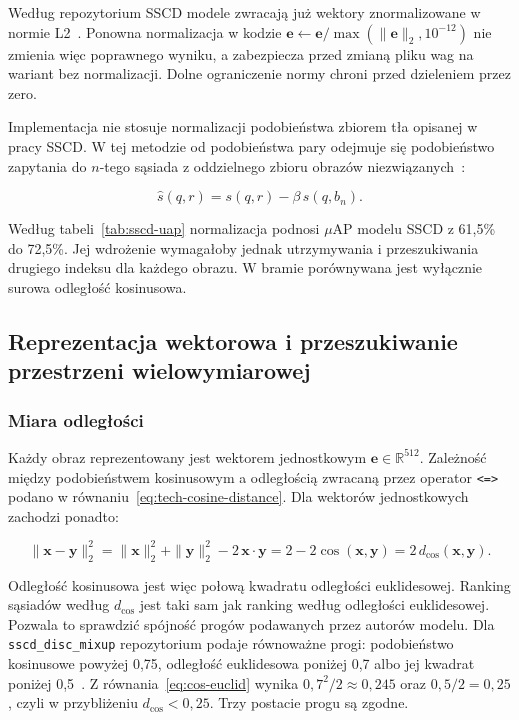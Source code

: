 Według repozytorium SSCD modele zwracają już wektory znormalizowane
w normie L2~\cite{sscd_repo}. Ponowna normalizacja w kodzie
\(\mathbf{e}\leftarrow\mathbf{e}/\max(\|\mathbf{e}\|_2,10^{-12})\)
nie zmienia więc poprawnego wyniku, a zabezpiecza przed zmianą pliku
wag na wariant bez normalizacji. Dolne ograniczenie normy chroni
przed dzieleniem przez zero.

Implementacja nie stosuje normalizacji podobieństwa zbiorem tła
opisanej w pracy SSCD. W tej metodzie od podobieństwa pary
odejmuje się podobieństwo zapytania do \(n\)-tego sąsiada
z oddzielnego zbioru obrazów niezwiązanych~\cite{pizzi2022sscd}:

\begin{equation}
\label{eq:sscd-score-norm}
\hat{s}(q,r)=s(q,r)-\beta\,s(q,b_n).
\end{equation}

Według tabeli~\ref{tab:sscd-uap} normalizacja podnosi
\(\mu\mathrm{AP}\) modelu SSCD z 61,5\% do 72,5\%. Jej wdrożenie
wymagałoby jednak utrzymywania i przeszukiwania drugiego indeksu
dla każdego obrazu. W bramie porównywana jest wyłącznie surowa
odległość kosinusowa.

\subsection{Reprezentacja wektorowa i przeszukiwanie przestrzeni
wielowymiarowej}
\label{sec:reprezentacja-wektorowa}

\subsubsection{Miara odległości}

Każdy obraz reprezentowany jest wektorem jednostkowym
\(\mathbf{e}\in\mathbb{R}^{512}\). Zależność między podobieństwem
kosinusowym a odległością zwracaną przez operator \texttt{<=>}
podano w równaniu~\eqref{eq:tech-cosine-distance}. Dla wektorów
jednostkowych zachodzi ponadto:

\begin{equation}
\label{eq:cos-euclid}
\|\mathbf{x}-\mathbf{y}\|_2^2
=\|\mathbf{x}\|_2^2+\|\mathbf{y}\|_2^2-2\,\mathbf{x}\cdot\mathbf{y}
=2-2\cos(\mathbf{x},\mathbf{y})
=2\,d_{\cos}(\mathbf{x},\mathbf{y}).
\end{equation}

Odległość kosinusowa jest więc połową kwadratu odległości
euklidesowej. Ranking sąsiadów według \(d_{\cos}\) jest taki sam jak
ranking według odległości euklidesowej. Pozwala to sprawdzić
spójność progów podawanych przez autorów modelu. Dla
\texttt{sscd\_disc\_mixup} repozytorium podaje równoważne progi:
podobieństwo kosinusowe powyżej 0,75, odległość euklidesowa poniżej
0,7 albo jej kwadrat poniżej 0,5~\cite{sscd_repo}.
Z równania~\eqref{eq:cos-euclid} wynika
\(0{,}7^2/2\approx0{,}245\) oraz \(0{,}5/2=0{,}25\), czyli
w przybliżeniu \(d_{\cos}<0{,}25\). Trzy postacie progu są zgodne.

